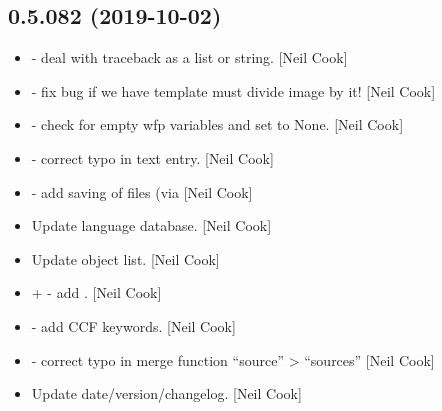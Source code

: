 \documentclass[a4paper,10pt,english]{report}
\begin{document}
\subsection{0.5.082 (2019-10-02)}
\label{\detokenize{misc/changelog:id60}}\begin{itemize}
\item {} 
 - deal with traceback as a list or
string. {[}Neil Cook{]}

\item {} 
 - fix bug if we have template must divide
image by it! {[}Neil Cook{]}

\item {} 
 - check for empty wfp variables and set to None.
{[}Neil Cook{]}

\item {} 
 - correct typo in text entry.
{[}Neil Cook{]}

\item {} 
 - add saving of files (via 
{[}Neil Cook{]}

\item {} 
Update language database. {[}Neil Cook{]}

\item {} 
Update object list. {[}Neil Cook{]}

\item {} 
 +  -
add . {[}Neil Cook{]}

\item {} 
 - add CCF keywords. {[}Neil Cook{]}

\item {} 
 - correct typo in merge function
“source” \textendash{}\textgreater{} “sources” {[}Neil Cook{]}

\item {} 
Update date/version/changelog. {[}Neil Cook{]}

\end{itemize}
\end{document}
